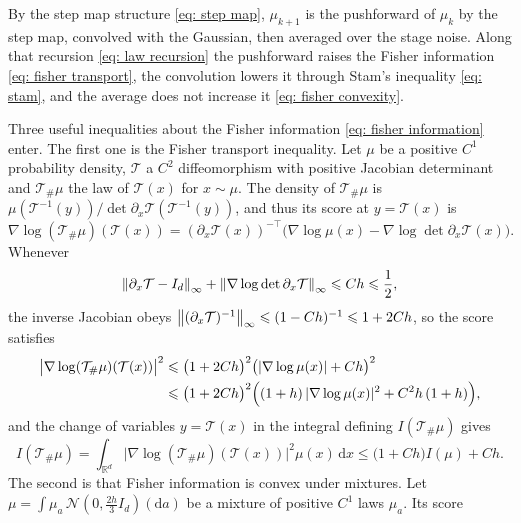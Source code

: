 \documentclass[namedate,webpdf,imanum]{ima-authoring-template}
\newcommand{\Le}{\leqslant}
\newcommand{\D}{\mathrm{d}}
\theoremstyle{thmstyletwo}
\numberwithin{equation}{section}
\begin{document}
By the step map structure \eqref{eq: step map}, $\mu_{k+1}$ is the pushforward of $\mu_k$ by the step map, convolved with the Gaussian, then averaged over the stage noise. Along that recursion \eqref{eq: law recursion} the pushforward raises the Fisher information \eqref{eq: fisher transport}, the convolution lowers it through Stam's inequality \eqref{eq: stam}, and the average does not increase it \eqref{eq: fisher convexity}.

Three useful inequalities about the Fisher information \eqref{eq: fisher information} enter. The first one is the Fisher transport inequality. Let $\mu$ be a positive $C^1$ probability density, $\mathcal T$ a $C^2$ diffeomorphism with positive Jacobian determinant and $\mathcal T_\# \mu$ the law of $\mathcal T(x)$ for $x \sim \mu$. The density of $\mathcal T_\# \mu$ is $\mu(\mathcal T^{-1}(y)) / \det \partial_x \mathcal T(\mathcal T^{-1}(y))$, and thus its score at $y = \mathcal T(x)$ is
\begin{equation*}
    \nabla \log (\mathcal T_\# \mu)(\mathcal T(x)) = (\partial_x \mathcal T(x))^{-\top} \bigl( \nabla \log \mu(x) - \nabla \log\det \partial_x \mathcal T(x) \bigr) .
\end{equation*}
Whenever
\begin{equation*}
    \norm{\partial_x \mathcal T - I_d}_\infty + \norm{\nabla \log\det \partial_x \mathcal T}_\infty \Le C h \Le \frac12 ,
\end{equation*}
the inverse Jacobian obeys $\norm{(\partial_x \mathcal T)^{-1}}_\infty \Le (1 - Ch)^{-1} \Le 1 + 2 C h$, so the score satisfies
\begin{align*}
    \bigl| \nabla \log (\mathcal T_\# \mu)(\mathcal T(x)) \bigr|^2
    & \Le \bigl( 1 + 2 C h \bigr)^2 \bigl( |\nabla \log \mu(x)| + C h \bigr)^2 \\
    & \Le \bigl( 1 + 2 C h \bigr)^2 \Bigl( ( 1 + h )\, |\nabla \log \mu(x)|^2 + C^2 h\, ( 1 + h ) \Bigr) ,
\end{align*}
and the change of variables $y = \mathcal T(x)$ in the integral defining $I(\mathcal T_\# \mu)$ gives
\begin{equation}
    \boxed{I(\mathcal T_\# \mu) = \int_{\mathbb R^d} \bigl| \nabla \log (\mathcal T_\# \mu)(\mathcal T(x)) \bigr|^2 \mu(x)\,\D x \Le \bigl( 1 + C h \bigr) I(\mu) + C h .}
    \label{eq: fisher transport}
\end{equation}
The second is that Fisher information is convex under mixtures. Let $\mu = \int \mu_a\, \mathcal N(0, \frac{2h}{3} I_d)(\D a)$ be a mixture of positive $C^1$ laws $\mu_a$. Its score
\end{document}
